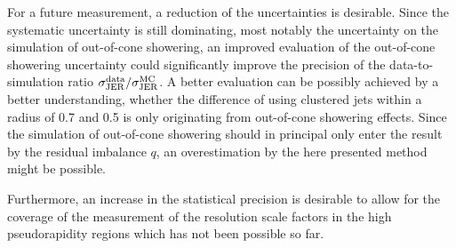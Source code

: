 For a future measurement, a reduction of the uncertainties is desirable.
Since the systematic uncertainty is still dominating, most notably the uncertainty on the simulation of out-of-cone showering, 
an improved  evaluation of the out-of-cone showering uncertainty could significantly improve the precision of the data-to-simulation ratio $\sigma_\mathrm{JER}^{\text{data}}/\sigma_\mathrm{JER}^{\text{MC}}$.
A better evaluation can be possibly achieved by a better understanding, whether the difference of \rhores using clustered jets within a radius of 0.7 and 0.5 is only originating from out-of-cone showering effects.
Since the simulation of out-of-cone showering should in principal only enter the result by the residual imbalance $q$, an overestimation by the here presented method might be possible.

Furthermore, an increase in the statistical precision is desirable to allow for the coverage of the measurement of the resolution scale factors in the high pseudorapidity regions which has not been possible so far.




